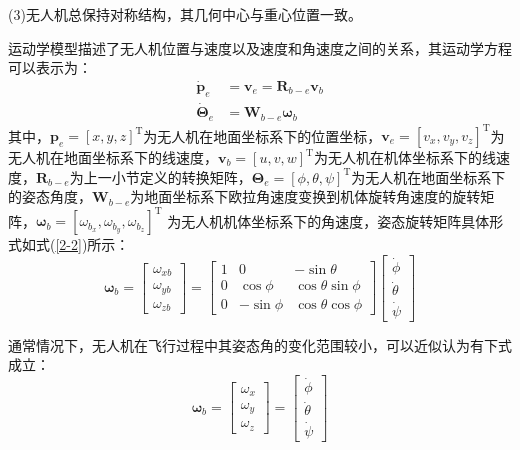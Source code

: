 \documentclass[lang=chs, degree=master, blindreview=false, winfonts=true]{yanputhesis}
\begin{document}
(3)无人机总保持对称结构，其几何中心与重心位置一致。

运动学模型描述了无人机位置与速度以及速度和角速度之间的关系，其运动学方程可以表示为：
\begin{equation}
    \begin{aligned}
	\dot{\boldsymbol{p}}_e &= \boldsymbol{v}_e = \bm{R}_{b-e} \bm{v}_b \\
	\dot{\bm{\Theta}}_e &= \bm{W}_{b-e}  \bm{\omega}_b
\end{aligned}\label{2-1}
\end{equation}
其中，$\boldsymbol{p}_e=\left[x,y,z\right]^\mathrm{T}$为无人机在地面坐标系下的位置坐标，$\boldsymbol{v}_e=\left[v_{x},v_{y},v_{z}\right]^\mathrm{T}$为无人机在地面坐标系下的线速度，$\boldsymbol{v}_b=\left[u,v,w\right]^\mathrm{T}$为无人机在机体坐标系下的线速度，$\boldsymbol{R}_{b-e}$为上一小节定义的转换矩阵，$\bm{\Theta}_e=\left[\phi,\theta,\psi\right]^\mathrm{T}$为无人机在地面坐标系下的姿态角度，$\bm{W}_{b-e}$为地面坐标系下欧拉角速度变换到机体旋转角速度的旋转矩阵，$\boldsymbol{\omega}_b=\left[{\omega}_{b_x},{\omega}_{b_y},{\omega}_{b_z}\right]^\mathrm{T}$ 为无人机机体坐标系下的角速度，姿态旋转矩阵具体形式如式(\ref{2-2})所示：
\begin{equation}
	\boldsymbol{\omega}_b=\begin{bmatrix}\omega_{xb}\\\omega_{yb}\\\omega_{zb}\end{bmatrix}=\begin{bmatrix}1&0&-\sin\theta\\0&\cos\phi&\cos\theta\sin\phi\\0&-\sin\phi&\cos\theta\cos\phi\end{bmatrix}\begin{bmatrix}\dot\phi\\\dot\theta\\\dot\psi\end{bmatrix}
	\label{2-2}
\end{equation}

通常情况下，无人机在飞行过程中其姿态角的变化范围较小，可以近似认为有下式成立：
\begin{equation}
	\boldsymbol{\omega}_b=\begin{bmatrix}{\omega}_x\\{\omega}_y\\{\omega}_z\end{bmatrix}=\begin{bmatrix}\dot{\phi}\\\dot{\theta}\\\dot{\psi}\end{bmatrix}
	\label{2-3}
\end{equation}
\end{document}
